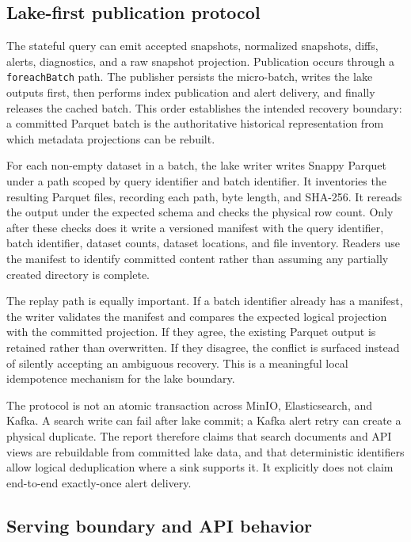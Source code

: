 \documentclass[a4paper,11pt]{article}
\begin{document}
\subsection{Lake-first publication protocol}

The stateful query can emit accepted snapshots, normalized snapshots, diffs, alerts, diagnostics, and a raw snapshot projection. Publication occurs through a \texttt{foreachBatch} path. The publisher persists the micro-batch, writes the lake outputs first, then performs index publication and alert delivery, and finally releases the cached batch. This order establishes the intended recovery boundary: a committed Parquet batch is the authoritative historical representation from which metadata projections can be rebuilt.

For each non-empty dataset in a batch, the lake writer writes Snappy Parquet under a path scoped by query identifier and batch identifier. It inventories the resulting Parquet files, recording each path, byte length, and SHA-256. It rereads the output under the expected schema and checks the physical row count. Only after these checks does it write a versioned manifest with the query identifier, batch identifier, dataset counts, dataset locations, and file inventory. Readers use the manifest to identify committed content rather than assuming any partially created directory is complete.

The replay path is equally important. If a batch identifier already has a manifest, the writer validates the manifest and compares the expected logical projection with the committed projection. If they agree, the existing Parquet output is retained rather than overwritten. If they disagree, the conflict is surfaced instead of silently accepting an ambiguous recovery. This is a meaningful local idempotence mechanism for the lake boundary.

The protocol is not an atomic transaction across MinIO, Elasticsearch, and Kafka. A search write can fail after lake commit; a Kafka alert retry can create a physical duplicate. The report therefore claims that search documents and API views are rebuildable from committed lake data, and that deterministic identifiers allow logical deduplication where a sink supports it. It explicitly does not claim end-to-end exactly-once alert delivery.

\subsection{Serving boundary and API behavior}
\end{document}
